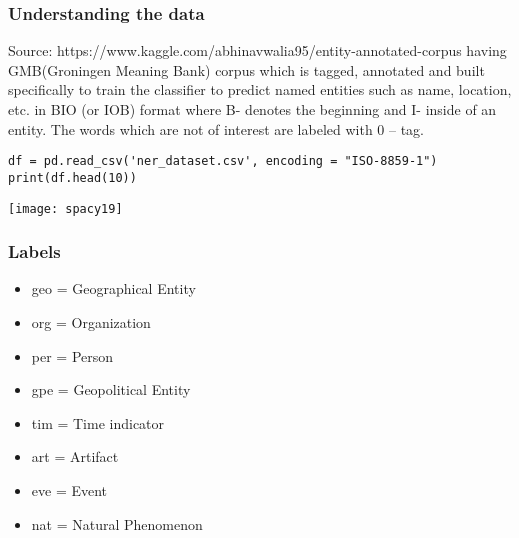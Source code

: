 \begin{frame}[fragile]\frametitle{Understanding the data}

Source: https://www.kaggle.com/abhinavwalia95/entity-annotated-corpus having GMB(Groningen Meaning Bank) corpus which is tagged, annotated and built specifically to train the classifier to predict named entities such as name, location, etc. in BIO (or IOB) format where  B- denotes the beginning and I- inside of an entity. The words which are not of interest are labeled with 0 – tag.

\begin{lstlisting}
df = pd.read_csv('ner_dataset.csv', encoding = "ISO-8859-1")
print(df.head(10))
\end{lstlisting}


\begin{center}
\texttt{[image: spacy19]}
\end{center}

\end{frame}

\begin{frame}[fragile]\frametitle{Labels}
  \begin{itemize}
  \item geo = Geographical Entity
  \item org = Organization
  \item per = Person
  \item gpe = Geopolitical Entity
  \item tim = Time indicator
  \item art = Artifact
  \item eve = Event
  \item nat = Natural Phenomenon
  \end{itemize}
	

\end{frame}

